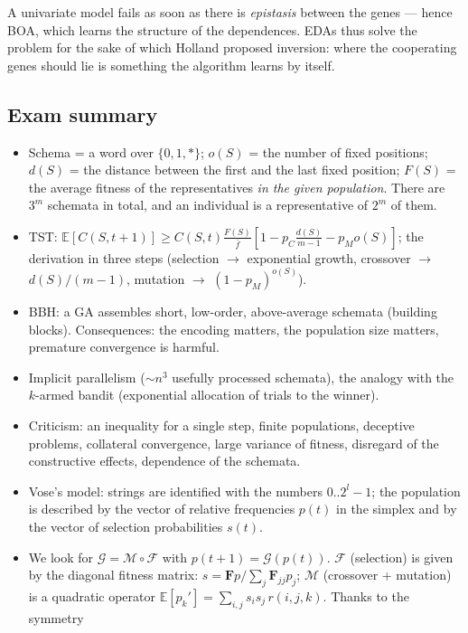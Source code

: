 \documentclass[11pt,a4paper]{article}
\theoremstyle{definition}
\begin{document}
A univariate model fails as soon as there is \emph{epistasis} between the genes --- hence
BOA, which learns the structure of the dependences. EDAs thus solve the problem for the sake
of which Holland proposed inversion: where the cooperating genes should lie is something the
algorithm learns by itself.

\subsection{Exam summary}

\begin{itemize}
\item Schema = a word over $\{0,1,*\}$; $o(S)$ = the number of fixed positions;
  $d(S)$ = the distance between the first and the last fixed position;
  $F(S)$ = the average fitness of the representatives \emph{in the given
  population}. There are $3^m$ schemata in total, and an individual is a
  representative of $2^m$ of them.
\item TST: $\mathbb{E}[C(S,t+1)] \ge C(S,t)\frac{F(S)}{\bar f}
  [1 - p_C \frac{d(S)}{m-1} - p_M o(S)]$; the derivation in three steps
  (selection $\to$ exponential growth, crossover $\to$ $d(S)/(m-1)$,
  mutation $\to$ $(1-p_M)^{o(S)}$).
\item BBH: a GA assembles short, low-order, above-average schemata (building
  blocks). Consequences: the encoding matters, the population size matters,
  premature convergence is harmful.
\item Implicit parallelism ($\sim n^3$ usefully processed schemata), the analogy
  with the $k$-armed bandit (exponential allocation of trials to the winner).
\item Criticism: an inequality for a single step, finite populations, deceptive
  problems, collateral convergence, large variance of fitness, disregard of the
  constructive effects, dependence of the schemata.
\item Vose's model: strings are identified with the numbers $0..2^l-1$; the
  population is described by the vector of relative frequencies $p(t)$ in the
  simplex and by the vector of selection probabilities $s(t)$.
\item We look for $\mathcal{G} = \mathcal{M} \circ \mathcal{F}$ with
  $p(t+1)=\mathcal{G}(p(t))$. $\mathcal{F}$ (selection) is given by the diagonal
  fitness matrix: $s = \mathbf{F}p / \sum_j \mathbf{F}_{jj}p_j$;
  $\mathcal{M}$ (crossover + mutation) is a quadratic operator
  $\mathbb{E}[p_k'] = \sum_{i,j} s_i s_j\, r(i,j,k)$. Thanks to the symmetry

\end{itemize}
\end{document}
